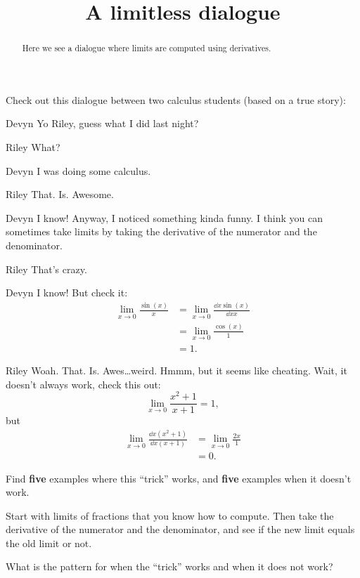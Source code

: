 \documentclass{ximera}
\title[Break-Ground:]{A limitless dialogue}
\begin{document}
\begin{abstract}
Here we see a dialogue where limits are computed using derivatives.
\end{abstract}
\maketitle

Check out this dialogue between two calculus students (based on a true
story):

\begin{dialogue}
\item[Devyn] Yo Riley, guess what I did last night?
\item[Riley] What?
\item[Devyn] I was doing some calculus.
\item[Riley] That. Is. Awesome.
\item[Devyn] I know! Anyway, I noticed something kinda funny. I
  think you can sometimes take limits by taking the derivative of the
  numerator and the denominator.
\item[Riley] That's crazy.
\item[Devyn] I know! But check it:
  \begin{align*}
    \lim_{x\to 0} \frac{\sin(x)}{x} &= \lim_{x\to 0} \frac{\dd{x}\sin(x)}{\dd{x}x}\\
    &= \lim_{x\to 0} \frac{\cos(x)}{1}\\
    &=1.
  \end{align*}
  \item[Riley] Woah. That. Is. Awes\dots weird. Hmmm, but it seems like
    cheating. Wait, it doesn't always work, check this out:
    \[
    \lim_{x\to 0} \frac{x^2+1}{x+1} = 1,
    \]
    but
    \begin{align*}
      \lim_{x\to 0} \frac{\dd{x}\left(x^2+1\right)}{\dd{x}\left(x+1\right)} &=
      \lim_{x\to 0} \frac{2x}{1} \\
      &=0.
    \end{align*}
\end{dialogue}

\begin{problem}
  Find \textbf{five} examples where this ``trick'' works, and
  \textbf{five} examples when it doesn't work.
  \begin{hint}
    Start with limits of fractions that you know how to compute. Then
    take the derivative of the numerator and the denominator, and see
    if the new limit equals the old limit or not.
  \end{hint}
  \begin{freeResponse}
  \end{freeResponse}
\end{problem}

\begin{problem}
  What is the pattern for when the ``trick'' works and when it does not work?
  \begin{freeResponse}
\end{freeResponse}
\end{problem}


\end{document}
